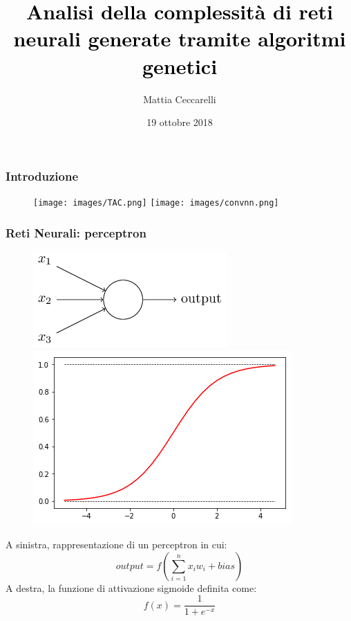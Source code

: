 \documentclass{beamer}
\begin{document}
\title{\textcolor{black}{Analisi della complessità di reti neurali generate tramite algoritmi genetici}}
\author{Mattia Ceccarelli}
\date{19 ottobre 2018}

\begin{frame}
 \maketitle
\end{frame}

\begin{frame}
 \frametitle{Introduzione}
 \begin{figure}
  \texttt{[image: images/TAC.png]}
  \texttt{[image: images/convnn.png]}
 \end{figure}

\end{frame}

\begin{frame}
 \frametitle{Reti Neurali: perceptron}
 \begin{figure}
   \includegraphics[scale = 0.5]{images/perceptron.png}    \includegraphics[scale = 0.35]{images/sigmoide.png}      
  \end{figure}
  A sinistra, rappresentazione di un perceptron in cui:
    \begin{equation}
     output = f(\sum_{i = 1}^{n}x_{i}w_{i} + bias)   
    \end{equation}
    A destra, la funzione di attivazione sigmoide definita come:  
    \begin{equation}
      f(x) = \frac{1}{1 + e^{-x}}
    \end{equation}
\end{frame}
\end{document}

